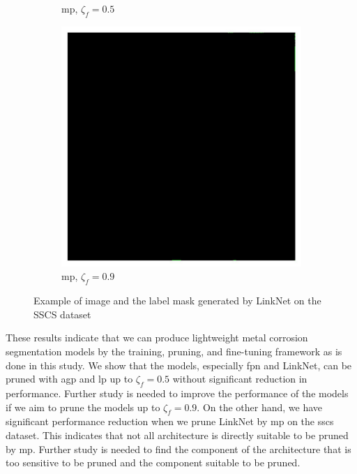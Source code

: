 \documentclass[mathematics,article,submit,pdftex,moreauthors]{Definitions/mdpi}
\begin{document}
\begin{figure}[!ht]
\begin{subfigure}[t]{.29\textwidth}
      \caption{\ac{mp}, $\zeta_f=0.5$}
      \label{fig:results:pruning:visualization:ccsc-linknet-mp-0.5}
    \end{subfigure}
    \begin{subfigure}[t]{.29\textwidth} 
      \centering
      \includegraphics[width=.95\linewidth]{figures/pruning-results/linknet_CCSC_movement/0/mask_0.9.jpg}
      \caption{\ac{mp}, $\zeta_f=0.9$}
      \label{fig:results:pruning:visualization:ccsc-linknet-mp-0.9}
    \end{subfigure}
    \caption{Example of image and the label mask generated by LinkNet on the SSCS dataset}
    \label{fig:results:pruning:visualization:ccsc}
\end{figure}

These results indicate that we can produce lightweight
metal corrosion segmentation models by the training, 
pruning, and fine-tuning framework as is done in this study.
We show that the models, especially \ac{fpn}
and LinkNet, can be pruned with \ac{agp}
and \ac{lp} up to $\zeta_f=0.5$ without
significant reduction in performance. 
Further study is needed to improve the performance of the models
if we aim to prune the models up to $\zeta_f=0.9$. 
On the other hand, we have
significant performance reduction when we 
prune LinkNet by \ac{mp}
on the \ac{sscs} dataset. This indicates that not all
architecture is directly suitable to be pruned by \ac{mp}.
Further study is needed to find the component of the
architecture that is too sensitive to be pruned
and the component suitable to be pruned. 
\end{document}
